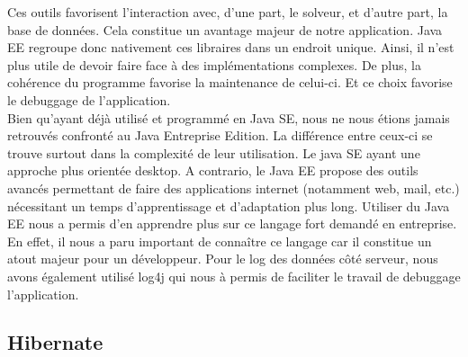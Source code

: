 Ces outils favorisent l'interaction avec, d'une part, le solveur, et d'autre part, la base de données. Cela constitue un avantage majeur de notre application. Java EE regroupe donc nativement ces libraires dans un endroit unique. Ainsi, il n'est plus utile  de devoir faire face à des implémentations complexes.
\newline
\indent
De plus, la cohérence du programme favorise la maintenance de celui-ci. Et ce choix favorise le debuggage de l'application.\\
\newline
\indent
Bien qu'ayant déjà utilisé et programmé en Java SE, nous ne nous étions jamais retrouvés confronté au Java Entreprise Edition. La différence entre ceux-ci se trouve surtout dans la complexité de leur utilisation. 
\newline
\indent
Le java SE ayant une approche plus orientée desktop. A contrario, le Java EE propose des outils avancés permettant de faire des applications internet (notamment web, mail, etc.) nécessitant un temps d'apprentissage et d'adaptation plus long. Utiliser du Java EE nous a permis d'en apprendre plus sur ce langage fort demandé en entreprise. En effet, il nous a paru important de connaître ce langage car il constitue un atout majeur pour un développeur.
\newline
\indent
Pour le log des données côté serveur, nous avons également utilisé log4j qui nous à permis de faciliter le travail de debuggage l'application.

\subsection{Hibernate}

